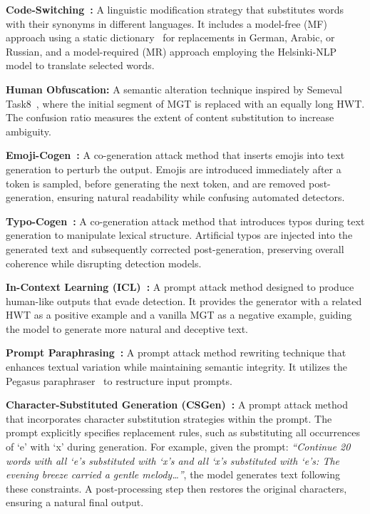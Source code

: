 \noindent
\textbf{Code-Switching~\cite{winata2023decades}:} A linguistic modification strategy that substitutes words with their synonyms in different languages. It includes a model-free (MF) approach using a static dictionary~\cite{zhang-etal-2020-improving, tiedemann-2012-parallel} for replacements in German, Arabic, or Russian, and a model-required (MR) approach employing the Helsinki-NLP~\cite{helsinki-nlp} model to translate selected words.

\noindent
\textbf{Human Obfuscation:} A semantic alteration technique inspired by Semeval Task8~\cite{siino2024badrock}, where the initial segment of MGT is replaced with an equally long HWT. The confusion ratio measures the extent of content substitution to increase ambiguity.

\noindent
\textbf{Emoji-Cogen~\cite{wang2024stumbling}:} A co-generation attack method that inserts emojis into text generation to perturb the output. Emojis are introduced immediately after a token is sampled, before generating the next token, and are removed post-generation, ensuring natural readability while confusing automated detectors.

\noindent
\textbf{Typo-Cogen~\cite{wang2024stumbling}:} A co-generation attack method that introduces typos during text generation to manipulate lexical structure. Artificial typos are injected into the generated text and subsequently corrected post-generation, preserving overall coherence while disrupting detection models.

\noindent
\textbf{In-Context Learning (ICL)~\cite{wang2024stumbling}:} A prompt attack method designed to produce human-like outputs that evade detection. It provides the generator with a related HWT as a positive example and a vanilla MGT as a negative example, guiding the model to generate more natural and deceptive text.

\noindent
\textbf{Prompt Paraphrasing~\cite{wang2024stumbling}:} A prompt attack method rewriting technique that enhances textual variation while maintaining semantic integrity. It utilizes the Pegasus paraphraser~\cite{zhang2020pegasus} to restructure input prompts.

\noindent
\textbf{Character-Substituted Generation (CSGen)~\cite{wang2024stumbling}:} A prompt attack method that incorporates character substitution strategies within the prompt. The prompt explicitly specifies replacement rules, such as substituting all occurrences of ‘e’ with ‘x’ during generation. For example, given the prompt: \textit{“Continue 20 words with all ‘e’s substituted with ‘x’s and all ‘x’s substituted with ‘e’s: The evening breeze carried a gentle melody…”}, the model generates text following these constraints. A post-processing step then restores the original characters, ensuring a natural final output.
